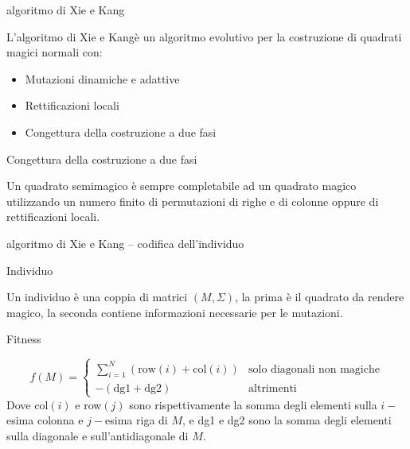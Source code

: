 \documentclass[10pt]{beamer}
\begin{document}
\begin{frame}{algoritmo di Xie e Kang}
			\parbox{0.98\columnwidth}{
			L'algoritmo di Xie e Kang\footnotemark[1] è un algoritmo evolutivo per la costruzione di quadrati magici normali con:
			\begin{itemize}
				\item Mutazioni dinamiche e adattive
				\item Rettificazioni locali
				\item Congettura della costruzione a due fasi
			\end{itemize}
		}

		\begin{alertblock}{Congettura della costruzione a due fasi}
		\parbox{0.98\columnwidth}{
Un quadrato semimagico è sempre completabile ad un quadrato magico utilizzando un numero finito di permutazioni di righe e di colonne oppure di rettificazioni locali.
		}
		\end{alertblock}
		
\end{frame}

\begin{frame}{algoritmo di Xie e Kang -- codifica dell'individuo}
    \begin{block}{Individuo}
    	\parbox{0.98\columnwidth}{
	    	Un individuo è una coppia di matrici $ (M,\Sigma) $, la prima è il quadrato da rendere magico, la seconda contiene informazioni necessarie per le mutazioni.
    	}
    \end{block}	
     \begin{block}{Fitness}
     	\parbox{0.98\columnwidth}{
			\[ f(M) = 
			\begin{cases}
			\sum_{i = 1}^{N}\left(\text{row}(i) + \text{col}(i) \right) & \text{solo diagonali non magiche} \\
			- \left(\text{dg1} + \text{dg2} \right) & \text{altrimenti} 
			\end{cases}
			\]
		Dove col$ (i) $ e row$ (j) $ sono rispettivamente la somma degli elementi sulla $ i- $esima colonna e $ j- $esima riga di $ M $, e dg1 e dg2 sono la somma degli elementi sulla diagonale e sull'antidiagonale di $ M $.
     	}
     \end{block}	
\end{frame}
\end{document}
